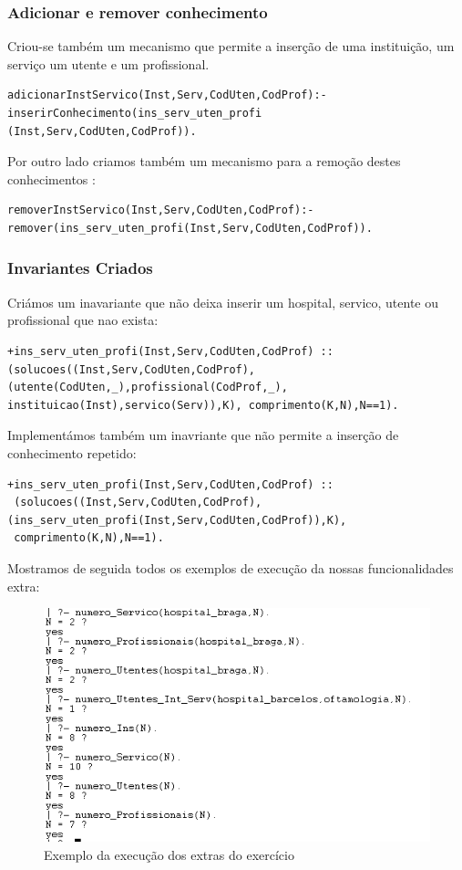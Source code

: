 \subsubsection{Adicionar e remover conhecimento}

Criou-se também um mecanismo que permite a inserção de uma instituição, um serviço um utente e um profissional. 

\begin{Verbatim}
adicionarInstServico(Inst,Serv,CodUten,CodProf):- 
inserirConhecimento(ins_serv_uten_profi
(Inst,Serv,CodUten,CodProf)).
\end{Verbatim}

Por outro lado criamos também um mecanismo para a remoção destes conhecimentos :
\begin{Verbatim}
removerInstServico(Inst,Serv,CodUten,CodProf):- 
remover(ins_serv_uten_profi(Inst,Serv,CodUten,CodProf)).
\end{Verbatim}

\subsubsection{Invariantes Criados}
Criámos um inavariante que não deixa inserir  um hospital, servico, utente ou profissional que nao exista:

\begin{Verbatim}
+ins_serv_uten_profi(Inst,Serv,CodUten,CodProf) :: 
(solucoes((Inst,Serv,CodUten,CodProf),
(utente(CodUten,_),profissional(CodProf,_),
instituicao(Inst),servico(Serv)),K), comprimento(K,N),N==1).
\end{Verbatim}

Implementámos também um inavriante que não permite a inserção de conhecimento repetido: 

\begin{Verbatim}
+ins_serv_uten_profi(Inst,Serv,CodUten,CodProf) ::
 (solucoes((Inst,Serv,CodUten,CodProf),
(ins_serv_uten_profi(Inst,Serv,CodUten,CodProf)),K),
 comprimento(K,N),N==1).
\end{Verbatim}



Mostramos de seguida todos os exemplos de execução da nossas funcionalidades extra: 
\begin{figure}[<+htpb+>]
	\centering
	\includegraphics[scale=0.9]{extras.png}
	\caption{Exemplo da execução dos extras do exercício}
	\label{p3:fig:output10}
\end{figure}


